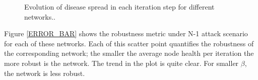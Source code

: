 \documentclass[11pt]{article}
\begin{document}
\begin{figure}[!htb]
\centering
{}
\caption{Evolution of disease spread in each iteration step for different networks..}\label{EVOLUTION}
\end{figure}
Figure \ref{ERROR_BAR} shows the robustness metric under N-1 attack scenario for each of these networks. Each of this scatter point quantifies the robustness of the corresponding network; the smaller the average node health per iteration the more robust is the network. The trend in the plot is quite clear. For smaller $\beta$, the network is less robust. 
\end{document}
